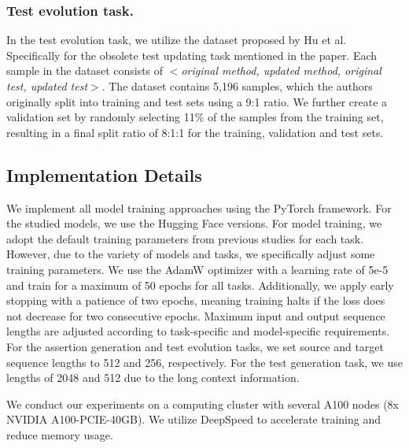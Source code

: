 \subsubsection{Test evolution task.}
In the test evolution task, we utilize the dataset proposed by Hu et al.~\cite{hu_identify_2023} Specifically for the obsolete test updating task mentioned in the paper. Each sample in the dataset consists of $<$\textit{original method, updated method, original test, updated test}$>$. The dataset contains 5,196 samples, which the authors originally split into training and test sets using a 9:1 ratio. We further create a validation set by randomly selecting 11\% of the samples from the training set, resulting in a final split ratio of 8:1:1 for the training, validation and test sets. 

























\subsection{Implementation Details}
\label{sec:implementation}



We implement all model training approaches using the PyTorch framework. For the studied models, we use the Hugging Face versions. For model training, we adopt the default training parameters from previous studies for each task. However, due to the variety of models and tasks, we specifically adjust some training parameters. We use the AdamW optimizer with a learning rate of 5e-5 and train for a maximum of 50 epochs for all tasks. Additionally, we apply early stopping with a patience of two epochs, meaning training halts if the loss does not decrease for two consecutive epochs.
Maximum input and output sequence lengths are adjusted according to task-specific and model-specific requirements. For the assertion generation and test evolution tasks, we set source and target sequence lengths to 512 and 256, respectively. For the test generation task, we use lengths of 2048 and 512 due to the long context information. 

We conduct our experiments on a computing cluster with several A100 nodes (8x NVIDIA A100-PCIE-40GB). We utilize DeepSpeed to accelerate training and reduce memory usage.





